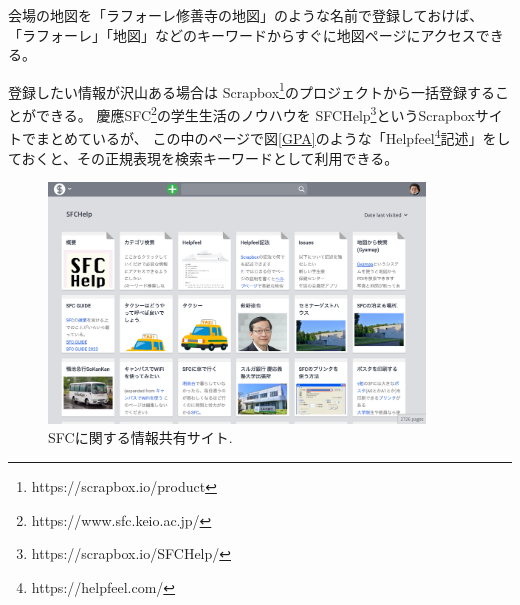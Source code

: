 \documentclass{ipsjprosym}
\begin{document}
会場の地図を「ラフォーレ修善寺の地図」のような名前で登録しておけば、
「ラフォーレ」「地図」などのキーワードからすぐに地図ページにアクセスできる。


登録したい情報が沢山ある場合は
Scrapbox\footnote{
  \textsf{https://scrapbox.io/product}
}のプロジェクトから一括登録することができる。
慶應SFC\footnote{
  \textsf{https://www.sfc.keio.ac.jp/}
}の学生生活のノウハウを
SFCHelp\footnote{
  \textsf{https://scrapbox.io/SFCHelp/}
}というScrapboxサイトでまとめているが、
この中のページで図\ref{GPA}のような「Helpfeel\footnote{
  \textsf{https://helpfeel.com/}
}記述」をしておくと、その正規表現を検索キーワードとして利用できる。

\begin{figure}[h]
  \includegraphics[width=10cm,bb=0 0 2094 1340]{figures/d3953ee26dadc46b4761014664a1c7a3.png}
  \caption{SFCに関する情報共有サイト.}
  \label{sfchelp}
\end{figure}
\end{document}
